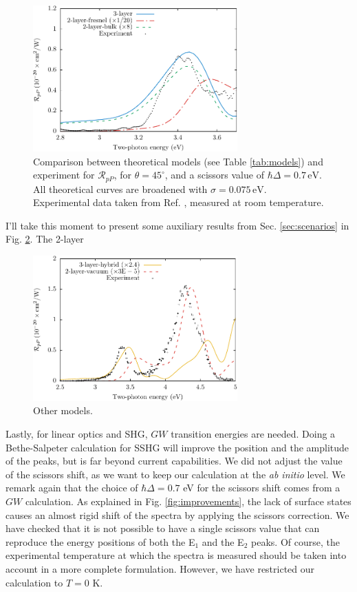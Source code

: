 \begin{figure}
\centering
\includegraphics[width=0.7\textwidth]{content/figures/fig-4_4_06}
\caption{Comparison between theoretical models (see Table \ref{tab:models}) and
experiment for $\mathcal{R}_{pP}$, for $\theta=45^{\circ}$, and a scissors
value of $\hbar\Delta = 0.7\,\text{eV}$. All theoretical curves are broadened
with $\sigma=0.075\,\text{eV}$. Experimental data taken from Ref.
\cite{mitchellSS01}, measured at room temperature.}
\label{fig:mitchellRpP}
\end{figure}

I'll take this moment to present some auxiliary results from Sec. \ref{sec:scenarios} in Fig. \ref{fig:othermodels}. The 2-layer

\begin{figure}
\centering 
\includegraphics[width=0.7\textwidth]{content/figures/fig-4_4_07}
\caption{Other models. \label{fig:othermodels}}
\end{figure}

Lastly, for linear optics and SHG, $GW$ transition energies are needed. Doing a Bethe-Salpeter calculation for SSHG will improve the position and the amplitude of the peaks, but is far beyond current capabilities.\cite{puff} We did not adjust the value of the scissors shift, as we want to keep our calculation at the {\em ab initio} level. We remark again that the choice of $\hbar\Delta=0.7$ eV for the scissors shift comes from a $GW$ calculation.\cite{liPRB10} As explained in Fig. \ref{fig:improvements}, the lack of surface states causes an almost rigid shift of the spectra by applying the scissors correction. We have checked that it is not possible to have a single scissors value that can reproduce the energy positions of both the E$_{1}$ and the E$_{2}$ peaks. Of course, the experimental temperature at which the spectra is measured should be taken into account in a more complete formulation. However, we have restricted our calculation to $T=0$ K.


